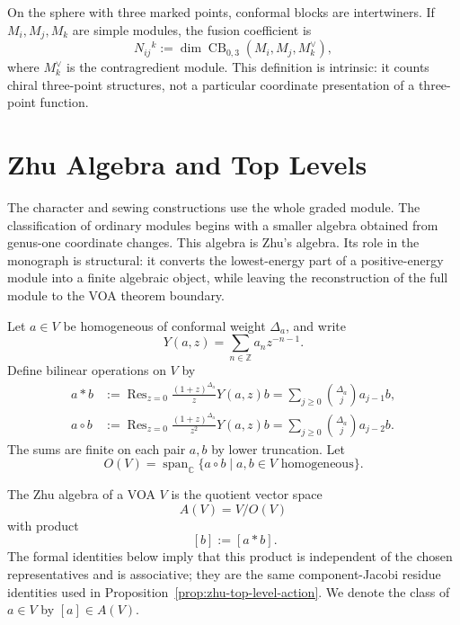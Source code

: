 On the sphere with three marked points, conformal blocks are intertwiners.
If \(M_i,M_j,M_k\) are simple modules, the fusion coefficient is
\[
  N_{ij}{}^k
  :=
  \dim \operatorname{CB}_{0,3}(M_i,M_j,M_k^\vee),
\]
where \(M_k^\vee\) is the contragredient module.  This definition is intrinsic:
it counts chiral three-point structures, not a particular coordinate
presentation of a three-point function.

\section{Zhu Algebra and Top Levels}

The character and sewing constructions use the whole graded module.  The
classification of ordinary modules begins with a smaller algebra obtained
from genus-one coordinate changes.  This algebra is Zhu's algebra.  Its role
in the monograph is structural: it converts the lowest-energy part of a
positive-energy module into a finite algebraic object, while leaving the
reconstruction of the full module to the VOA theorem boundary.

Let \(a\in V\) be homogeneous of conformal weight \(\Delta_a\), and write
\[
  Y(a,z)=\sum_{n\in\mathbb Z}a_n z^{-n-1}.
\]
Define bilinear operations on \(V\) by
\begin{align}
  a*b
  &:=
  \operatorname{Res}_{z=0}
  \frac{(1+z)^{\Delta_a}}{z}Y(a,z)b
  =
  \sum_{j\ge0}\binom{\Delta_a}{j}a_{j-1}b,
  \label{eq:zhu-star-product}\\
  a\circ b
  &:=
  \operatorname{Res}_{z=0}
  \frac{(1+z)^{\Delta_a}}{z^2}Y(a,z)b
  =
  \sum_{j\ge0}\binom{\Delta_a}{j}a_{j-2}b .
  \label{eq:zhu-circle-product}
\end{align}
The sums are finite on each pair \(a,b\) by lower truncation.  Let
\[
  O(V)=\operatorname{span}_{\mathbb C}\{a\circ b\mid a,b\in V
  \text{ homogeneous}\}.
\]

\begin{definition}
\label{def:zhu-algebra}
The Zhu algebra of a VOA \(V\) is the quotient vector space
\begin{equation}
  A(V)=V/O(V)
  \label{eq:zhu-algebra-quotient}
\end{equation}
with product
\begin{equation}
  [a]\,[b]:=[a*b].
  \label{eq:zhu-product-on-classes}
\end{equation}
The formal identities below imply that this product is independent of the
chosen representatives and is associative; they are the same component-Jacobi
residue identities used in Proposition~\ref{prop:zhu-top-level-action}.  We
denote the class of \(a\in V\) by \([a]\in A(V)\).
\end{definition}


